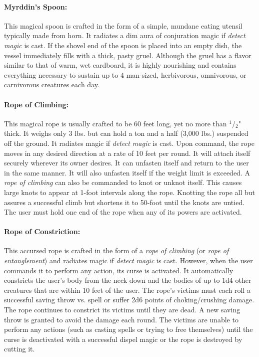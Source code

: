 \begin{multicols}{2}
\paragraph{Myrddin's Spoon:} This magical spoon is crafted in the form of a simple, mundane eating utensil typically made from horn.  It radiates a dim aura of conjuration magic if \textit{detect magic} is cast.  If the shovel end of the spoon is placed into an empty dish, the vessel immediately fills with a thick, pasty gruel.  Although the gruel has a flavor similar to that of warm, wet cardboard, it is highly nourishing and contains everything necessary to sustain up to 4 man-sized, herbivorous, omnivorous, or carnivorous creatures each day.

\paragraph{Rope of Climbing:} This magical rope is usually crafted to be 60 feet long, yet no more than $^1$/$_2$" thick.  It weighs only 3 lbs. but can hold a ton and a half (3,000 lbs.) suspended off the ground.  It radiates magic if \textit{detect magic} is cast.  Upon command, the rope moves in any desired direction at a rate of 10 feet per round.  It will attach itself securely wherever its owner desires.  It can unfasten itself and return to the user in the same manner.  It will also unfasten itself if the weight limit is exceeded.  A \textit{rope of climbing} can also be commanded to knot or unknot itself.  This causes large knots to appear at 1-foot intervals along the rope.  Knotting the rope all but assures a successful climb but shortens it to 50-foot until the knots are untied.  The user must hold one end of the rope when any of its powers are activated.

\paragraph{Rope of Constriction:} This accursed rope is crafted in the form of a \textit{rope of climbing} (or \textit{rope of entanglement}) and radiates magic if \textit{detect magic} is cast.  However, when the user commands it to perform any action, its curse is activated.  It automatically constricts the user's body from the neck down and the bodies of up to 1d4 other creatures that are within 10 feet of the user.  The rope's victims must each roll a successful saving throw vs. spell or suffer 2d6 points of choking/crushing damage.  The rope continues to constrict its victims until they are dead.  A new saving throw is granted to avoid the damage each round.  The victims are unable to perform any actions (such as casting spells or trying to free themselves) until the curse is deactivated with a successful dispel magic or the rope is destroyed by cutting it.  


\end{multicols}

